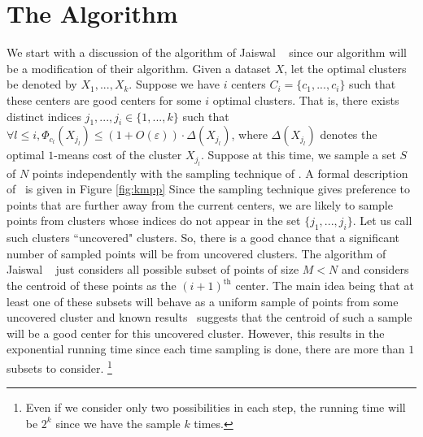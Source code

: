 \section{The Algorithm}
We start with a discussion of the algorithm of Jaiswal \etal\ \cite{jks} since our algorithm will be a modification of their algorithm.
Given a dataset $X$, let the optimal clusters be denoted by $X_1, ..., X_k$.
Suppose we have $i$ centers $C_i = \{c_1, ..., c_i\}$ such that these centers are good centers for some $i$ optimal clusters. 
That is, there exists distinct indices $j_1, ..., j_i \in \{1, ..., k\}$ such that $\forall l \leq i, \Phi_{c_l}(X_{j_l}) \leq (1 + O(\varepsilon)) \cdot \Delta(X_{j_l})$, where $\Delta(X_{j_l})$ denotes the optimal $1$-means cost of the cluster $X_{j_l}$.
Suppose at this time, we sample a set $S$ of $N$ points independently with the sampling technique of \kmpp. 
A formal description of \kmpp\ is given in Figure \ref{fig:kmpp}
Since the sampling technique gives preference to points that are further away from the current centers, we are likely to sample points from clusters whose indices do not appear in the set $\{j_1, ..., j_i\}$.
Let us call such clusters ``uncovered" clusters.
So, there is a good chance that a significant number of sampled points will be from uncovered clusters.
The algorithm of Jaiswal \etal\ \cite{jks} just considers all possible subset of points of size $M < N$ and considers the centroid of these points as the $(i+1)^{\textrm{th}}$ center. 
The main idea being that at least one of these subsets will behave as a uniform sample of points from some uncovered cluster and known results~\cite{inaba} suggests that the centroid of such a sample will be a good center for this uncovered cluster.
However, this results in the exponential running time since each time sampling is done, there are more than $1$ subsets to consider. 
\footnote{Even if we consider only two possibilities in each step, the running time will be $2^k$ since we have the sample $k$ times.}


